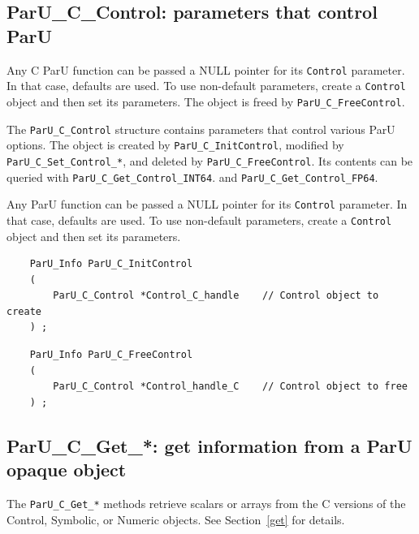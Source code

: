 \documentclass[12pt]{article}
\begin{document}
\subsection{{\sf ParU\_C\_Control}: parameters that control ParU}

    Any C ParU function can be passed a NULL pointer for its \verb'Control'
    parameter.  In that case, defaults are used.  To use non-default
    parameters, create a \verb'Control' object and then set its parameters.
    The object is freed by \verb'ParU_C_FreeControl'.

    The \verb'ParU_C_Control' structure contains parameters that control
    various ParU options.  The object is created by \verb'ParU_C_InitControl',
    modified by \verb'ParU_C_Set_Control_*', and deleted by
    \verb'ParU_C_FreeControl'.  Its contents can be queried with
    \verb'ParU_C_Get_Control_INT64'.  and \verb'ParU_C_Get_Control_FP64'.

    Any ParU function can be passed a NULL pointer for its \verb'Control'
    parameter.  In that case, defaults are used.  To use non-default
    parameters, create a \verb'Control' object and then set its parameters.

    {\footnotesize
    \begin{verbatim}
    ParU_Info ParU_C_InitControl
    (
        ParU_C_Control *Control_C_handle    // Control object to create
    ) ; \end{verbatim} }

    {\footnotesize
    \begin{verbatim}
    ParU_Info ParU_C_FreeControl
    (
        ParU_C_Control *Control_handle_C    // Control object to free
    ) ; \end{verbatim} }

\subsection{{\sf ParU\_C\_Get\_*}: get information from a ParU opaque object}

The \verb'ParU_C_Get_*' methods retrieve scalars or arrays from the C versions
of the Control, Symbolic, or Numeric objects.  See Section~\ref{get} for
details.
\end{document}

